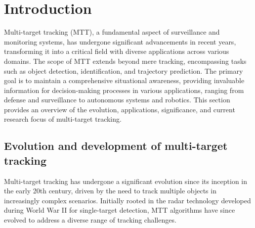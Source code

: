 \chapter*{Introduction}
\setcounter{page}{1}

	
Multi-target tracking (MTT), a fundamental aspect of surveillance and monitoring systems, has undergone significant advancements in recent years, transforming it into a critical field with diverse applications across various domains.
The scope of MTT extends beyond mere tracking, encompassing tasks such as object detection, identification, and trajectory prediction. The primary goal is to maintain a comprehensive situational awareness, providing invaluable information for decision-making processes in various applications, ranging from defense and surveillance to autonomous systems and robotics.
This section provides an overview of the evolution, applications, significance, and current research focus of multi-target tracking.
\section{Evolution and development of multi-target tracking}
Multi-target tracking has undergone a significant evolution since its inception in the early 20th century, driven by
the need to track multiple objects in increasingly complex scenarios. Initially rooted in the radar technology
developed during World War II \cite{bar1995} for single-target detection, MTT algorithms have since evolved to address a diverse range of tracking challenges.


